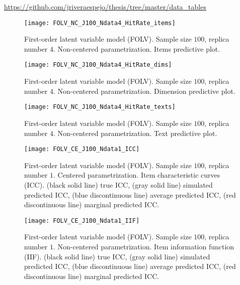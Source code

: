 \noindent \url{https://github.com/jriveraespejo/thesis/tree/master/data_tables} \\
%
\begin{figure}[H]
	\centering
	\texttt{[image: FOLV\_NC\_J100\_Ndata4\_HitRate\_items]}
	\caption[First-order latent variable model (FOLV). Sample size $100$, replica number $4$. Non-centered parametrization. Items predictive plot.]%
	{First-order latent variable model (FOLV). Sample size $100$, replica number $4$. Non-centered parametrization. Items predictive plot.}
	\label{fig:FOLV_NC_hitrate_items}
\end{figure}
%
\begin{figure}[H]
	\centering
	\texttt{[image: FOLV\_NC\_J100\_Ndata4\_HitRate\_dims]}
	\caption[First-order latent variable model (FOLV). Sample size $100$, replica number $4$. Non-centered parametrization. Dimension predictive plot.]%
	{First-order latent variable model (FOLV). Sample size $100$, replica number $4$. Non-centered parametrization. Dimension predictive plot.}
	\label{fig:FOLV_NC_hitrate_dim}
\end{figure}
%
\begin{figure}[H]
	\centering
	\texttt{[image: FOLV\_NC\_J100\_Ndata4\_HitRate\_texts]}
	\caption[First-order latent variable model (FOLV). Sample size $100$, replica number $4$. Non-centered parametrization. Text predictive plot.]%
	{First-order latent variable model (FOLV). Sample size $100$, replica number $4$. Non-centered parametrization. Text predictive plot.}
	\label{fig:FOLV_NC_hitrate_text}
\end{figure}
%
\begin{figure}[H]
	\centering
	\texttt{[image: FOLV\_CE\_J100\_Ndata1\_ICC]}
	\caption[First-order latent variable model (FOLV). Sample size $100$, replica number $1$. Centered parametrization. Item characteristic curves (ICC).]%
	{First-order latent variable model (FOLV). Sample size $100$, replica number $1$. Centered parametrization. Item characteristic curves (ICC). (black solid line) true ICC, (gray solid line) simulated predicted ICC, (blue discontinuous line) average predicted ICC, (red discontinuous line) marginal predicted ICC. }
	\label{fig:FOLV_CE_ICC}
\end{figure}
%
\begin{figure}[H]
	\centering
	\texttt{[image: FOLV\_CE\_J100\_Ndata1\_IIF]}
	\caption[First-order latent variable model (FOLV). Sample size $100$, replica number $1$. Non-centered parametrization. Item information function (IIF).]%
	{First-order latent variable model (FOLV). Sample size $100$, replica number $1$. Non-centered parametrization. Item information function (IIF). (black solid line) true ICC, (gray solid line) simulated predicted ICC, (blue discontinuous line) average predicted ICC, (red discontinuous line) marginal predicted ICC.}
	\label{fig:FOLV_CE_IIF}
\end{figure}
